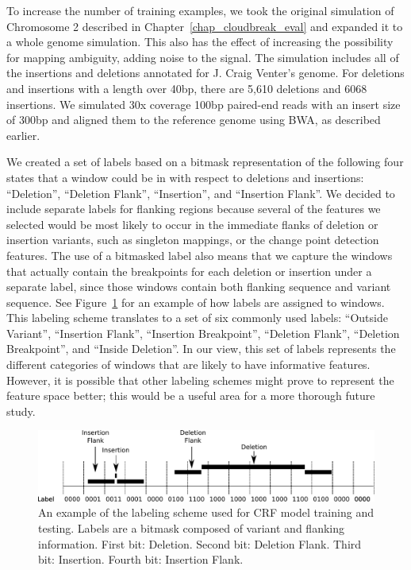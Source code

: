 To increase the number of training examples, we took the original simulation of Chromosome 2 described in Chapter~\ref{chap_cloudbreak_eval} and expanded it to a whole genome simulation. This also has the effect of increasing the possibility for mapping ambiguity, adding noise to the signal. The simulation includes all of the insertions and deletions annotated for J. Craig Venter's genome. For deletions and insertions with a length over 40bp, there are 5,610 deletions and 6068 insertions. We simulated 30x coverage 100bp paired-end reads with an insert size of 300bp and aligned them to the reference genome using BWA, as described earlier. 

We created a set of labels based on a bitmask representation of the following four states that a window could be in with respect to deletions and insertions: ``Deletion'', ``Deletion Flank'', ``Insertion'', and ``Insertion Flank''. We decided to include separate labels for flanking regions because several of the features we selected would be most likely to occur in the immediate flanks of deletion or insertion variants, such as singleton mappings, or the change point detection features. The use of a bitmasked label also means that we capture the windows that actually contain the breakpoints for each deletion or insertion under a separate label, since those windows contain both flanking sequence and variant sequence. See Figure~\ref{crf_labels} for an example of how labels are assigned to windows. This labeling scheme translates to a set of six commonly used labels: ``Outside Variant'', ``Insertion Flank'', ``Insertion Breakpoint'', ``Deletion Flank'', ``Deletion Breakpoint'', and ``Inside Deletion''. In our view, this set of labels represents the different categories of windows that are likely to have informative features. However, it is possible that other labeling schemes might prove to represent the feature space better; this would be a useful area for a more thorough future study.

\begin{figure}
\centering
\includegraphics[width=1\textwidth]{figures/crf_labelling.pdf}
\caption{An example of the labeling scheme used for CRF model training and testing. Labels are a bitmask composed of variant and flanking information. First bit: Deletion. Second bit: Deletion Flank. Third bit: Insertion. Fourth bit: Insertion Flank.}
\label{crf_labels}
\end{figure}


